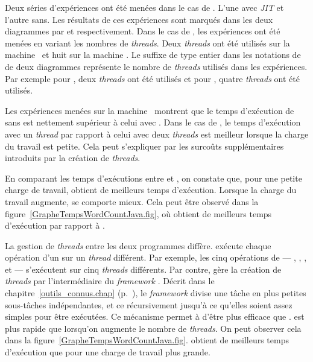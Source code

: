 Deux s\'eries d'exp\'eriences ont \'et\'e men\'ees dans le cas de . L'une avec \emph{JIT} et l'autre sans. Les r\'esultats de ces exp\'eriences sont marqu\'es dans les deux diagrammes par  et  respectivement. Dans le cas de , les exp\'eriences ont \'et\'e men\'ees en variant les nombres de \emph{threads}. Deux \emph{threads} ont \'et\'e utilis\'es sur la machine \ et huit sur la machine . Le suffixe de type entier dans les notations de  de deux diagrammes repr\'esente le nombre de \emph{threads} utilis\'es dans les exp\'eriences. Par exemple pour , deux \emph{threads} ont \'et\'e utilis\'es et pour , quatre \emph{threads} ont \'et\'e utilis\'es.



Les exp\'eriences men\'ees sur la machine \ montrent que le temps d'ex\'ecution de  sans  est nettement sup\'erieur \`a celui avec . Dans le cas de , le temps d'ex\'ecution avec un \emph{thread} par rapport \`a celui avec deux \emph{threads} est meilleur lorsque la charge du travail est petite. Cela peut s'expliquer par les surco\^uts suppl\'ementaires introduits par la cr\'eation de \emph{threads}.

En comparant les temps d'ex\'ecutions entre  et , on constate que, pour une petite charge de travail,  obtient de meilleurs temps d'ex\'ecution. Lorsque la charge du travail augmente,  se comporte mieux. Cela peut \^etre observ\'e dans la figure~\ref{GrapheTempsWordCountJava.fig}, o\`u  obtient de meilleurs temps d'ex\'ecution par rapport \`a . 

La gestion de \emph{threads} entre les deux programmes diff\`ere.  ex\'ecute chaque op\'eration d'un  sur un \emph{thread} diff\'erent. Par exemple, les cinq op\'erations de  --- , , ,  et  --- s'ex\'ecutent sur cinq \emph{threads} diff\'erents. Par contre,  g\`ere la cr\'eation de \emph{threads} par l'interm\'ediaire du \emph{framework} . D\'ecrit dans le chapitre~\ref{outils_connus.chap} (p.~\pageref{forkjoin.sect}), le \emph{framework} divise une t\^ache en plus petites sous-t\^aches ind\'ependantes, et ce r\'ecursivement jusqu'\`a ce qu'elles soient assez simples pour \^etre ex\'ecut\'ees. Ce m\'ecanisme permet \`a  d'\^etre plus efficace que .  est plus rapide que  lorsqu'on augmente le nombre de \emph{threads}. On peut observer cela dans la figure~\ref{GrapheTempsWordCountJava.fig}.  obtient de meilleurs temps d'ex\'ecution que  pour une charge de travail plus grande.

